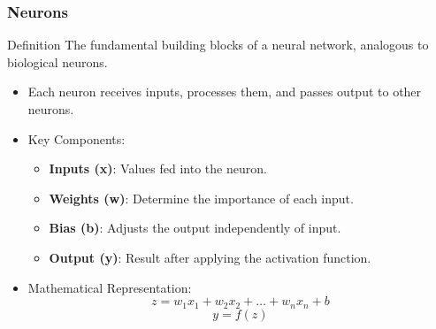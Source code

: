 \documentclass[aspectratio=169]{beamer}
\begin{document}
\begin{frame}[fragile]
    \frametitle{Neurons}
    \begin{block}{Definition}
        The fundamental building blocks of a neural network, analogous to biological neurons.
    \end{block}
    \begin{itemize}
        \item Each neuron receives inputs, processes them, and passes output to other neurons.
        \item Key Components:
        \begin{itemize}
            \item \textbf{Inputs (x)}: Values fed into the neuron.
            \item \textbf{Weights (w)}: Determine the importance of each input.
            \item \textbf{Bias (b)}: Adjusts the output independently of input.
            \item \textbf{Output (y)}: Result after applying the activation function.
        \end{itemize}
        \item Mathematical Representation:
        \begin{equation}
          z = w_1x_1 + w_2x_2 + \ldots + w_nx_n + b
        \end{equation}
        \begin{equation}
          y = f(z)
        \end{equation}
    \end{itemize}
\end{frame}
\end{document}
